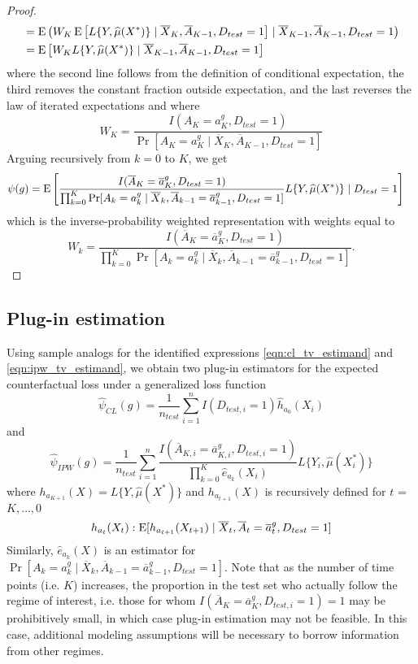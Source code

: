 \begin{proof}
\begin{align*}
        &= \operatorname{E}\left(W_K \operatorname{E}\left[L\{Y, \widehat{\mu}(X^*)\} \mid \overline{X}_K, \overline{A}_{K-1}, D_{test} = 1\right] \mid \overline{X}_{K-1}, \overline{A}_{K-1}, D_{test} = 1\right)\\
        &= \operatorname{E}\left[W_K L\{Y, \widehat{\mu}(X^*)\} \mid \overline{X}_{K-1}, \overline{A}_{K-1}, D_{test} = 1\right]
    \end{align*}
    where the second line follows from the definition of conditional expectation, the third removes the constant fraction outside expectation, and the last reverses the law of iterated expectations and where 
    $$W_K = \frac{I(A_K = a_K^g, D_{test} = 1)}{\Pr[A_K = a_K^g \mid \overline{X}_K, \overline{A}_{K-1}, D_{test} = 1]}$$
    Arguing recursively from $k = 0$ to $K$, we get
    \begin{align*}
        \psi(g) &= \operatorname{E}\left[\frac{I(\overline{A}_K = \overline{a}^g_K, D_{test} = 1)}{\prod_{k=0}^K\Pr[A_k = a^g_k \mid \overline{X}_k, \overline{A}_{k-1} = \overline{a}^g_{k-1}, D_{test} = 1]}L\{Y, \widehat{\mu}(X^*)\} \mid D_{test} = 1\right] 
    \end{align*}
    which is the inverse-probability weighted representation with weights equal to 
    $$W_k = \frac{I(\overline{A}_K = \overline{a}^g_K, D_{test} = 1)}{\prod_{k=0}^K\Pr[A_k = a^g_k \mid \overline{X}_k, \overline{A}_{k-1} = \overline{a}^g_{k-1}, D_{test} = 1]}.$$
\end{proof}

\subsection{Plug-in estimation}

Using sample analogs for the identified expressions \ref{eqn:cl_tv_estimand} and \ref{eqn:ipw_tv_estimand}, we obtain two plug-in estimators for the expected counterfactual loss under a generalized loss function
\begin{equation*}
    \widehat{\psi}_{CL}(g) = \frac{1}{n_{test}}\sum_{i=1}^nI(D_{test, i} = 1)\widehat{h}_{a_0}(X_i)
\end{equation*}
and 
\begin{equation*}
    \widehat{\psi}_{IPW}(g) = \frac{1}{n_{test}}\sum_{i=1}^n \frac{I(\overline{A}_{K,i} = \overline{a}^g_{K,i}, D_{test,i} = 1)}{\prod_{k=0}^K \widehat{e}_{a_k}(X_i)} L\{Y_i, \widehat{\mu}(X^*_i)\}
\end{equation*}
where $h_{a_{K+1}}(X) = L\{Y, \widehat{\mu}(X^*)\}$ and $h_{a_{t+1}}(X)$ is recursively defined for $t$ = $K, \ldots, 0$
\[h_{a_t}(X_t) : \operatorname{E}[ h_{a_{t+1}}(X_{t+1}) \mid \overline{X}_t, \overline{A}_t = \overline{a}^g_t, D_{test} = 1]\]
Similarly, $\widehat{e}_{a_k}(X)$ is an estimator for $\Pr[A_k = a^g_k \mid \overline{X}_k, \overline{A}_{k-1} = \overline{a}^g_{k-1}, D_{test} = 1]$. Note that as the number of time points (i.e. $K$) increases, the proportion in the test set who actually follow the regime of interest, i.e. those for whom $I(\overline{A}_K = \overline{a}^g_K, D_{test,i} = 1)=1$ may be prohibitively small, in which case plug-in estimation may not be feasible. In this case, additional modeling assumptions will be necessary to borrow information from other regimes.
\newpage


